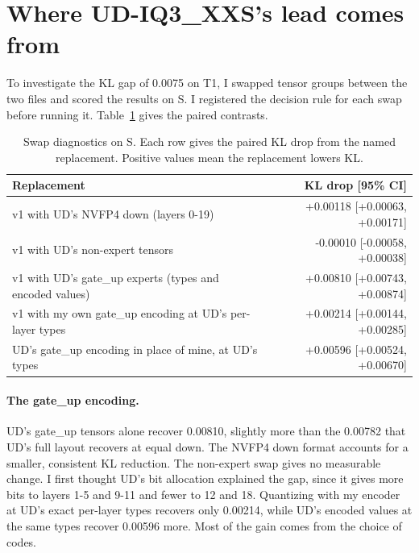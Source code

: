 \documentclass[11pt,a4paper]{article}
\begin{document}
\section{Where UD-IQ3\_XXS's lead comes from}
\label{sec:diagnosis}

To investigate the KL gap of 0.0075 on T1, I swapped tensor groups between the two files and scored the results on S. I registered the decision rule for each swap before running it. Table~\ref{tab:swap} gives the paired contrasts.

\begin{table}[t]
\centering\small
\caption{Swap diagnostics on S. Each row gives the paired KL drop from the named replacement. Positive values mean the replacement lowers KL.}
\label{tab:swap}
\begin{tabular}{lr}
\toprule
Replacement & KL drop [95\% CI] \\
\midrule
v1 with UD's NVFP4 down (layers 0-19) & +0.00118 [+0.00063, +0.00171] \\
v1 with UD's non-expert tensors & -0.00010 [-0.00058, +0.00038] \\
v1 with UD's gate\_up experts (types and encoded values) & +0.00810 [+0.00743, +0.00874] \\
v1 with my own gate\_up encoding at UD's per-layer types & +0.00214 [+0.00144, +0.00285] \\
UD's gate\_up encoding in place of mine, at UD's types & +0.00596 [+0.00524, +0.00670] \\
\bottomrule
\end{tabular}
\end{table}

\paragraph{The gate\_up encoding.} UD's gate\_up tensors alone recover 0.00810, slightly more than the 0.00782 that UD's full layout recovers at equal down. The NVFP4 down format accounts for a smaller, consistent KL reduction. The non-expert swap gives no measurable change. I first thought UD's bit allocation explained the gap, since it gives more bits to layers 1-5 and 9-11 and fewer to 12 and 18. Quantizing with my encoder at UD's exact per-layer types recovers only 0.00214, while UD's encoded values at the same types recover 0.00596 more. Most of the gain comes from the choice of codes.
\end{document}
